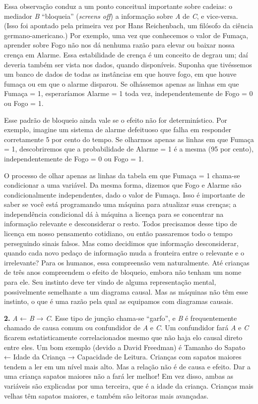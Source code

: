 \documentclass[11pt,a5paper,twoside]{book}
\begin{document}
Essa observação conduz a um ponto conceitual importante sobre cadeias: o mediador \textit{B} “bloqueia” (\textit{screens off}) a informação sobre \textit{A} de \textit{C}, e vice-versa. (Isso foi apontado pela primeira vez por Hans Reichenbach, um filósofo da ciência germano-americano.) Por exemplo, uma vez que conhecemos o valor de Fumaça, aprender sobre Fogo não nos dá nenhuma razão para elevar ou baixar nossa crença em Alarme. Essa estabilidade de crença é um conceito de degrau um; daí deveria também ser vista nos dados, quando disponíveis. Suponha que tivéssemos um banco de dados de todas as instâncias em que houve fogo, em que houve fumaça ou em que o alarme disparou. Se olhássemos apenas as linhas em que Fumaça = 1, esperaríamos Alarme = 1 toda vez, independentemente de Fogo = 0 ou Fogo = 1.

Esse padrão de bloqueio ainda vale se o efeito não for determinístico. Por exemplo, imagine um sistema de alarme defeituoso que falha em responder corretamente 5 por cento do tempo. Se olharmos apenas as linhas em que Fumaça = 1, descobriremos que a probabilidade de Alarme = 1 é a mesma (95 por cento), independentemente de Fogo = 0 ou Fogo = 1.

O processo de olhar apenas as linhas da tabela em que Fumaça = 1 chama-se condicionar a uma variável. Da mesma forma, dizemos que Fogo e Alarme são condicionalmente independentes, dado o valor de Fumaça. Isso é importante de saber se você está programando uma máquina para atualizar suas crenças; a independência condicional dá à máquina a licença para se concentrar na informação relevante e desconsiderar o resto. Todos precisamos desse tipo de licença em nosso pensamento cotidiano, ou então passaremos todo o tempo perseguindo sinais falsos. Mas como decidimos que informação desconsiderar, quando cada novo pedaço de informação muda a fronteira entre o relevante e o irrelevante? Para os humanos, essa compreensão vem naturalmente. Até crianças de três anos compreendem o efeito de bloqueio, embora não tenham um nome para ele. Seu instinto deve ter vindo de alguma representação mental, possivelmente semelhante a um diagrama causal. Mas as máquinas não têm esse instinto, o que é uma razão pela qual as equipamos com diagramas causais.

\textbf{2.} \textit{A} ← \textit{B} → \textit{C}. Esse tipo de junção chama-se “garfo”, e \textit{B} é frequentemente chamado de causa comum ou confundidor de \textit{A} e \textit{C}. Um confundidor fará \textit{A} e \textit{C} ficarem estatisticamente correlacionados mesmo que não haja elo causal direto entre eles. Um bom exemplo (devido a David Freedman) é Tamanho do Sapato ← Idade da Criança → Capacidade de Leitura. Crianças com sapatos maiores tendem a ler em um nível mais alto. Mas a relação não é de causa e efeito. Dar a uma criança sapatos maiores não a fará ler melhor! Em vez disso, ambas as variáveis são explicadas por uma terceira, que é a idade da criança. Crianças mais velhas têm sapatos maiores, e também são leitoras mais avançadas.
\end{document}
